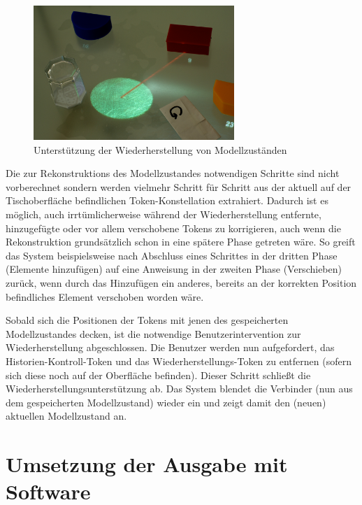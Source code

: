 \begin{figure}[htbp]
	\centering
		\includegraphics[height=2in]{img/SystemNeu/WiederherstellungTisch.jpg}
	\caption{Unterstützung der Wiederherstellung von Modellzuständen}
	\label{fig:img_SystemNeu_WiederherstellungTisch}
\end{figure}

Die zur Rekonstruktions des Modellzustandes notwendigen Schritte sind nicht vorberechnet sondern werden vielmehr Schritt für Schritt aus der aktuell auf der Tischoberfläche befindlichen Token-Konstellation extrahiert. Dadurch ist es möglich, auch irrtümlicherweise während der Wiederherstellung entfernte, hinzugefügte oder vor allem verschobene Tokens zu korrigieren, auch wenn die Rekonstruktion grundsätzlich schon in eine spätere Phase getreten wäre. So greift das System beispielsweise nach Abschluss eines Schrittes in der dritten Phase (Elemente hinzufügen) auf eine Anweisung in der zweiten Phase (Verschieben) zurück, wenn durch das Hinzufügen ein anderes, bereits an der korrekten Position befindliches Element verschoben worden wäre.

Sobald sich die Positionen der Tokens mit jenen des gespeicherten Modellzustandes decken, ist die notwendige Benutzerintervention zur Wiederherstellung abgeschlossen. Die Benutzer werden nun aufgefordert, das Historien-Kontroll-Token und das Wiederherstellungs-Token zu entfernen (sofern sich diese noch auf der Oberfläche befinden). Dieser Schritt schließt die Wiederherstellungsunterstützung ab. Das System blendet die Verbinder (nun aus dem gespeicherten Modellzustand) wieder ein und zeigt damit den (neuen) aktuellen Modellzustand an. 



\section{Umsetzung der Ausgabe mit Software} %
\label{sec:umsetzung_der_ausgabe_mit_software}

